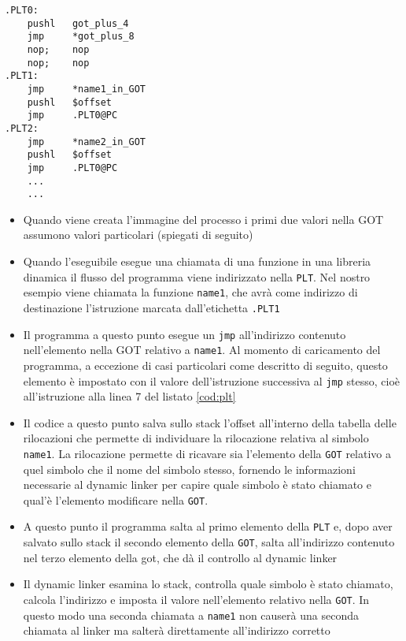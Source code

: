 \begin{lstlisting}[caption=Procedure linkage table, label=cod:plt]
.PLT0:
    pushl   got_plus_4
    jmp     *got_plus_8
    nop;    nop
    nop;    nop
.PLT1:
    jmp     *name1_in_GOT
    pushl   $offset
    jmp     .PLT0@PC
.PLT2:
    jmp     *name2_in_GOT
    pushl   $offset
    jmp     .PLT0@PC
    ...
    ...
\end{lstlisting}

\begin{itemize}
\item Quando viene creata l'immagine del processo i primi due valori
  nella GOT assumono valori particolari (spiegati di seguito)
\item Quando l'eseguibile esegue una chiamata di una funzione in una
  libreria dinamica il flusso del programma viene indirizzato nella
  \lstinline{PLT}. Nel nostro esempio viene chiamata la funzione
  \lstinline{name1}, che avrà come indirizzo di destinazione
  l'istruzione marcata dall'etichetta \lstinline{.PLT1}
\item Il programma a questo punto esegue un \lstinline{jmp}
  all'indirizzo contenuto nell'elemento nella GOT relativo a
  \lstinline{name1}. Al momento di caricamento del programma, a
  eccezione di casi particolari come descritto di seguito, questo
  elemento è impostato con il valore dell'istruzione successiva al
  \lstinline{jmp} stesso, cioè all'istruzione alla linea 7 del listato
  \ref{cod:plt}
\item Il codice a questo punto salva sullo stack l'offset all'interno
  della tabella delle rilocazioni che permette di individuare la
  rilocazione relativa al simbolo \lstinline{name1}. La rilocazione
  permette di ricavare sia l'elemento della \lstinline{GOT} relativo a
  quel simbolo che il nome del simbolo stesso, fornendo le
  informazioni necessarie al dynamic linker per capire quale simbolo è
  stato chiamato e qual'è l'elemento modificare nella \lstinline{GOT}.
\item A questo punto il programma salta al primo elemento della
  \lstinline{PLT} e, dopo aver salvato sullo stack il secondo elemento
  della \lstinline{GOT}, salta all'indirizzo contenuto nel terzo
  elemento della got, che dà il controllo al dynamic linker
\item Il dynamic linker esamina lo stack, controlla quale simbolo è
  stato chiamato, calcola l'indirizzo e imposta il valore
  nell'elemento relativo nella \lstinline{GOT}. In questo modo una
  seconda chiamata a \lstinline{name1} non causerà una seconda
  chiamata al linker ma salterà direttamente all'indirizzo corretto
\end{itemize}

